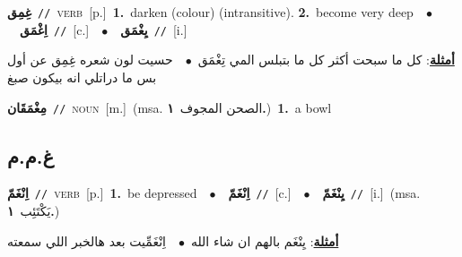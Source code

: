 \documentclass[10pt,a4paper,twoside]{article} %
\begin{document}
\begin{multicols}{2}
{\setlength\topsep{0pt}\textbf{\foreignlanguage{arabic}{غِمِق}}\ {\color{gray}\texttt{//}\color{black}}\ \textsc{verb}\ [p.]\ \textbf{1.}~darken (colour) (intransitive).  \textbf{2.}~become very deep\ \ $\bullet$\ \ \setlength\topsep{0pt}\textbf{\foreignlanguage{arabic}{اِغْمَق}}\ {\color{gray}\texttt{//}\color{black}}\ [c.]\ \ $\bullet$\ \ \setlength\topsep{0pt}\textbf{\foreignlanguage{arabic}{يِغْمَق}}\ {\color{gray}\texttt{//}\color{black}}\ [i.]\  \begin{flushright}\color{gray}\foreignlanguage{arabic}{\textbf{\underline{\foreignlanguage{arabic}{أمثلة}}}: كل ما سبحت أكثر كل ما بتبلس المي تِغْمَق\ $\bullet$\ \  حسيت لون شعره غِمِق عن أول بس ما دراتلي انه بيكون صبغ}\end{flushright}\color{black}} \vspace{2mm}

{\setlength\topsep{0pt}\textbf{\foreignlanguage{arabic}{مِغْمَقَان}}\ {\color{gray}\texttt{//}\color{black}}\ \textsc{noun}\ [m.]\ \color{gray}(msa. \foreignlanguage{arabic}{الصحن المجوف}~\foreignlanguage{arabic}{\textbf{١.}})\color{black}\ \textbf{1.}~a bowl\ } \vspace{2mm}

\vspace{-3mm}
\subsection*{\color{blue}\foreignlanguage{arabic}{غ.م.م}\color{blue}{}} 

{\setlength\topsep{0pt}\textbf{\foreignlanguage{arabic}{اِنْغَمّ}}\ {\color{gray}\texttt{//}\color{black}}\ \textsc{verb}\ [p.]\ \textbf{1.}~be depressed\ \ $\bullet$\ \ \setlength\topsep{0pt}\textbf{\foreignlanguage{arabic}{اِنْغَمّ}}\ {\color{gray}\texttt{//}\color{black}}\ [c.]\ \ $\bullet$\ \ \setlength\topsep{0pt}\textbf{\foreignlanguage{arabic}{يِنْغَمّ}}\ {\color{gray}\texttt{//}\color{black}}\ [i.]\ \color{gray}(msa. \foreignlanguage{arabic}{يَكْتَئِب}~\foreignlanguage{arabic}{\textbf{١.}})\color{black}\  \begin{flushright}\color{gray}\foreignlanguage{arabic}{\textbf{\underline{\foreignlanguage{arabic}{أمثلة}}}: يِنْغَم بالهم ان شاء الله\ $\bullet$\ \  اِنْغَمِّيت بعد هالخبر اللي سمعته}\end{flushright}\color{black}} \vspace{2mm}


\end{multicols}
\end{document}
